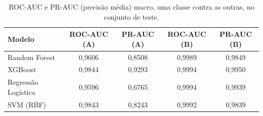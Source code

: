 \begin{table}[htbp]
  \centering
  \caption{ROC-AUC e PR-AUC (precisão média) macro, uma classe contra as outras, no conjunto de teste.}
  \label{tab:roc_auc}
  \begin{tabular}{lcccc}
    \toprule
    Modelo & ROC-AUC (A) & PR-AUC (A) & ROC-AUC (B) & PR-AUC (B) \\
    \midrule
    Random Forest & 0,9606 & 0,8508 & 0,9989 & 0,9849 \\
    XGBoost & 0,9844 & 0,9293 & 0,9994 & 0,9950 \\
    Regressão Logística & 0,9596 & 0,6765 & 0,9994 & 0,9939 \\
    SVM (RBF) & 0,9843 & 0,8243 & 0,9992 & 0,9839 \\
    \bottomrule
  \end{tabular}
\end{table}
